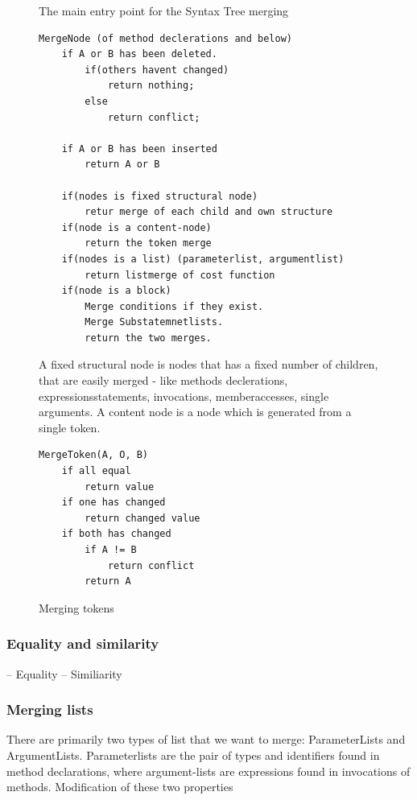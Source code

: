 \documentclass[11pt]{article}
\begin{document}
\begin{figure}
  \caption{The main entry point for the Syntax Tree merging}
  \label{MergeNode}
\begin{verbatim}
MergeNode (of method declerations and below)
    if A or B has been deleted.
        if(others havent changed)
            return nothing;
        else
            return conflict;
            
    if A or B has been inserted
        return A or B
        
    if(nodes is fixed structural node)
        retur merge of each child and own structure
    if(node is a content-node) 
        return the token merge
    if(nodes is a list) (parameterlist, argumentlist)
        return listmerge of cost function
    if(node is a block)
        Merge conditions if they exist.
        Merge Substatemnetlists.
        return the two merges.

\end{verbatim}
\caption{A fixed structural node is nodes that has a fixed number of children, that are easily merged - like methods declerations, expressionsstatements, invocations, memberaccesses, single arguments. A content node is a node which is generated from a single token.}
\end{figure}


\begin{figure}
  \caption{Merging tokens}
  \label{MergeToken}
\begin{verbatim}
MergeToken(A, O, B)
    if all equal
        return value
    if one has changed
        return changed value
    if both has changed 
        if A != B
            return conflict
        return A
\end{verbatim}
\end{figure}


\subsubsection{Equality and similarity}
-- Equality
-- Similiarity

\subsubsection{Merging lists}
There are primarily two types of list that we want to merge: ParameterLists and ArgumentLists. Parameterlists are the pair of types and identifiers found in method declarations, where argument-lists are expressions found in invocations of methods. Modification of these two properties 
\end{document}
